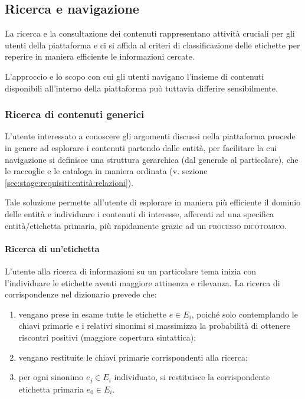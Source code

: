 \documentclass[10pt,a4paper,headinclude,footinclude,hidelinks]{scrreprt} %
\begin{document}
	\subsection{Ricerca e navigazione}
	\label{sec:stage:requisiti:ricerca}
	La ricerca e la consultazione dei contenuti rappresentano attività cruciali per gli utenti della piattaforma e ci si affida al criteri di classificazione delle etichette per reperire in maniera efficiente le informazioni cercate.

	L'approccio e lo scopo con cui gli utenti navigano l'insieme di contenuti disponibili all'interno della piattaforma può tuttavia differire sensibilmente.

	\subsubsection{Ricerca di contenuti generici}
	\label{sec:stage:requisiti:ricerca:generica}
	L'utente interessato a conoscere gli argomenti discussi nella piattaforma procede in genere ad esplorare i contenuti partendo dalle entità, per facilitare la cui navigazione si definisce una struttura gerarchica (dal generale al particolare), che le raccoglie e le cataloga in maniera ordinata (v. sezione	\ref{sec:stage:requisiti:entità:relazioni}).

	Tale soluzione permette all'utente di esplorare in maniera più efficiente il dominio delle entità e individuare i contenuti di interesse, afferenti ad una specifica entità/etichetta primaria, più rapidamente grazie ad un \textsc{processo dicotomico}.
	
	\paragraph{Ricerca di un'etichetta}
	L'utente alla ricerca di informazioni su un particolare tema inizia con l'individuare le etichette aventi maggiore attinenza e rilevanza. La ricerca di corrispondenze nel dizionario prevede che:
	\begin{enumerate}
	\item vengano prese in esame tutte le etichette $e \in E_i$, poiché solo contemplando le chiavi primarie e i relativi sinonimi si massimizza la probabilità di ottenere riscontri positivi (maggiore copertura sintattica);
	\item vengano restituite le chiavi primarie corrispondenti alla ricerca;
	\item per ogni sinonimo $e_j \in E_i$ individuato, si restituisce la corrispondente etichetta primaria $e_0 \in E_i$.
	\end{enumerate}
\end{document}
